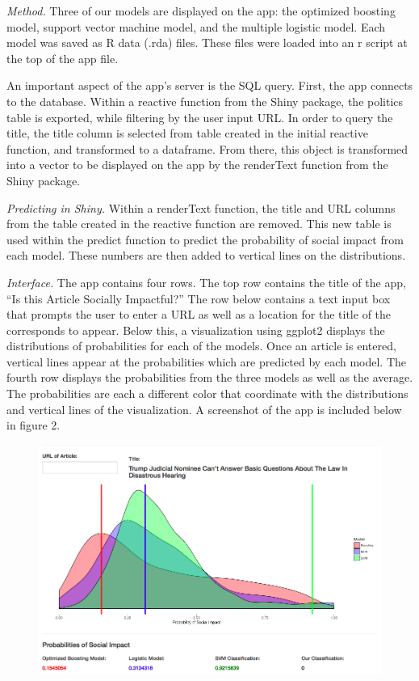 \documentclass[10pt,letterpaper]{article}
\begin{document}
\emph{Method.} Three of our models are displayed on the app: the
optimized boosting model, support vector machine model, and the multiple
logistic model. Each model was saved as R data (.rda) files. These files
were loaded into an r script at the top of the app file.

An important aspect of the app's server is the SQL query. First, the app
connects to the database. Within a reactive function from the Shiny
package, the politics table is exported, while filtering by the user
input URL. In order to query the title, the title column is selected
from table created in the initial reactive function, and transformed to
a dataframe. From there, this object is transformed into a vector to be
displayed on the app by the renderText function from the Shiny package.

\emph{Predicting in Shiny.} Within a renderText function, the title and
URL columns from the table created in the reactive function are removed.
This new table is used within the predict function to predict the
probability of social impact from each model. These numbers are then
added to vertical lines on the distributions.

\emph{Interface.} The app contains four rows. The top row contains the
title of the app, ``Is this Article Socially Impactful?'' The row below
contains a text input box that prompts the user to enter a URL as well
as a location for the title of the corresponds to appear. Below this, a
visualization using ggplot2 displays the distributions of probabilities
for each of the models. Once an article is entered, vertical lines
appear at the probabilities which are predicted by each model. The
fourth row displays the probabilities from the three models as well as
the average. The probabilities are each a different color that
coordinate with the distributions and vertical lines of the
visualization. A screenshot of the app is included below in figure 2.

\begin{figure}
\centering
\includegraphics{Screen Shot 2018-04-19 at 9.47.35 AM.png}
\caption{}
\end{figure}
\end{document}
